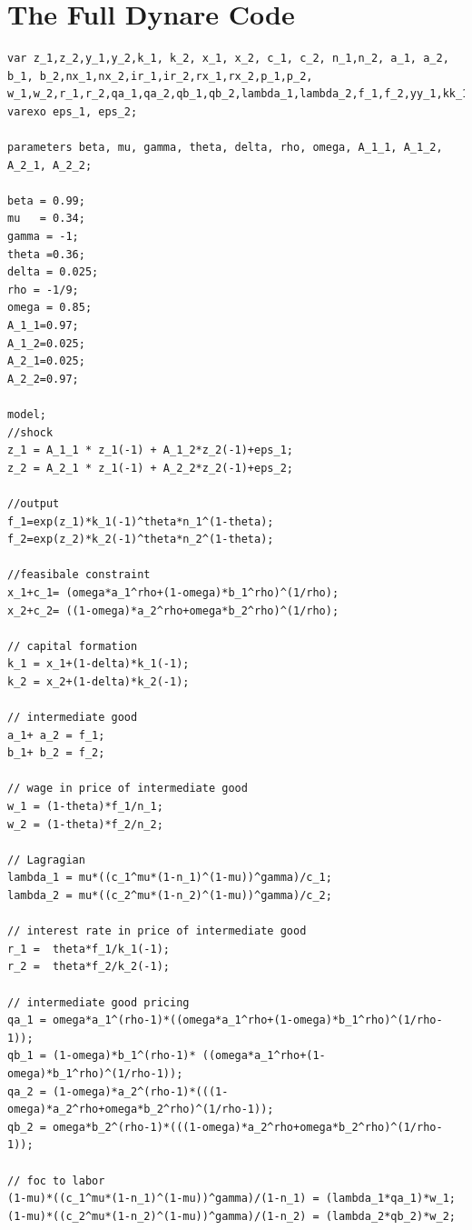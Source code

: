 \documentclass[11pt,a4paper]{article}
\begin{document}
\section{The Full Dynare Code}
\begin{lstlisting}
var z_1,z_2,y_1,y_2,k_1, k_2, x_1, x_2, c_1, c_2, n_1,n_2, a_1, a_2, b_1, b_2,nx_1,nx_2,ir_1,ir_2,rx_1,rx_2,p_1,p_2, w_1,w_2,r_1,r_2,qa_1,qa_2,qb_1,qb_2,lambda_1,lambda_2,f_1,f_2,yy_1,kk_1,xx_1,cc_1,aa_1,bb_1,nn_1,rr_1,yy_2,kk_2,xx_2,cc_2,aa_2,bb_2,nn_2,rr_2;
varexo eps_1, eps_2;

parameters beta, mu, gamma, theta, delta, rho, omega, A_1_1, A_1_2, A_2_1, A_2_2;

beta = 0.99;
mu   = 0.34;
gamma = -1;
theta =0.36;
delta = 0.025;
rho = -1/9;
omega = 0.85;
A_1_1=0.97;
A_1_2=0.025;
A_2_1=0.025;
A_2_2=0.97;

model;
//shock
z_1 = A_1_1 * z_1(-1) + A_1_2*z_2(-1)+eps_1;
z_2 = A_2_1 * z_1(-1) + A_2_2*z_2(-1)+eps_2;

//output
f_1=exp(z_1)*k_1(-1)^theta*n_1^(1-theta);
f_2=exp(z_2)*k_2(-1)^theta*n_2^(1-theta);

//feasibale constraint
x_1+c_1= (omega*a_1^rho+(1-omega)*b_1^rho)^(1/rho);
x_2+c_2= ((1-omega)*a_2^rho+omega*b_2^rho)^(1/rho);

// capital formation
k_1 = x_1+(1-delta)*k_1(-1);
k_2 = x_2+(1-delta)*k_2(-1);

// intermediate good
a_1+ a_2 = f_1;
b_1+ b_2 = f_2;

// wage in price of intermediate good
w_1 = (1-theta)*f_1/n_1;
w_2 = (1-theta)*f_2/n_2;

// Lagragian
lambda_1 = mu*((c_1^mu*(1-n_1)^(1-mu))^gamma)/c_1;
lambda_2 = mu*((c_2^mu*(1-n_2)^(1-mu))^gamma)/c_2;

// interest rate in price of intermediate good
r_1 =  theta*f_1/k_1(-1);
r_2 =  theta*f_2/k_2(-1);

// intermediate good pricing
qa_1 = omega*a_1^(rho-1)*((omega*a_1^rho+(1-omega)*b_1^rho)^(1/rho-1));
qb_1 = (1-omega)*b_1^(rho-1)* ((omega*a_1^rho+(1-omega)*b_1^rho)^(1/rho-1));
qa_2 = (1-omega)*a_2^(rho-1)*(((1-omega)*a_2^rho+omega*b_2^rho)^(1/rho-1));
qb_2 = omega*b_2^(rho-1)*(((1-omega)*a_2^rho+omega*b_2^rho)^(1/rho-1));

// foc to labor
(1-mu)*((c_1^mu*(1-n_1)^(1-mu))^gamma)/(1-n_1) = (lambda_1*qa_1)*w_1;
(1-mu)*((c_2^mu*(1-n_2)^(1-mu))^gamma)/(1-n_2) = (lambda_2*qb_2)*w_2;


\end{lstlisting}
\end{document}
